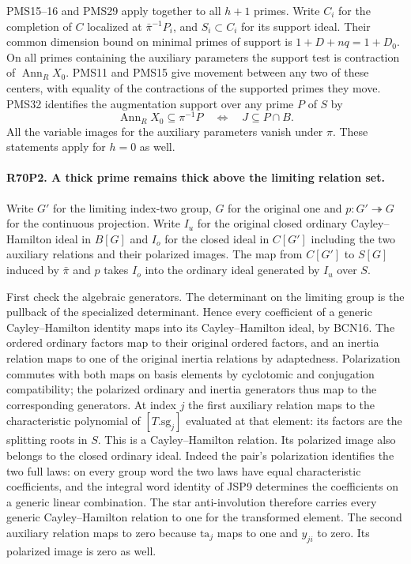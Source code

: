 PMS15--16 and PMS29 apply together to all $h+1$ primes.
Write $C_i$ for the completion of $C$ localized at
$\bar\pi^{-1}P_i$, and $S_i\subset C_i$ for its support ideal.
Their common dimension bound on minimal primes of support is
$1+D+nq=1+D_0$. On all primes containing the auxiliary parameters
the support test is contraction of $\operatorname{Ann}_R X_0$.
PMS11 and PMS15 give movement between any two of these centers,
with equality of the contractions of the supported primes
they move. PMS32 identifies the augmentation support over any
prime $P$ of $S$ by
\[
 \operatorname{Ann}_R X_0\subseteq\pi^{-1}P
       \quad\Longleftrightarrow\quad J\subseteq P\cap B .
\]
All the variable images for the auxiliary parameters vanish under
$\pi$. These statements apply for $h=0$ as well.

\paragraph{R70P2. A thick prime remains thick above the limiting relation set.}
Write $G'$ for the limiting index-two group, $G$ for the original
one and $p:G'\twoheadrightarrow G$ for the continuous projection.
Write $I_u$ for the original closed ordinary Cayley--Hamilton
ideal in $B[G]$ and $I_o$ for the closed ideal in $C[G']$ including
the two auxiliary relations and their polarized images. The map
from $C[G']$ to $S[G]$ induced by $\bar\pi$ and $p$ takes
$I_o$ into the ordinary ideal generated by $I_u$ over $S$.

First check the algebraic generators. The determinant on the
limiting group is the pullback of the specialized determinant.
Hence every coefficient of a generic Cayley--Hamilton identity
maps into its Cayley--Hamilton ideal, by BCN16. The ordered
ordinary factors map to their original ordered factors, and
an inertia relation maps to one of the original inertia
relations by adaptedness. Polarization commutes with both maps
on basis elements by cyclotomic and conjugation compatibility;
the polarized ordinary and inertia generators thus map to the
corresponding generators. At index $j$ the first auxiliary
relation maps to the characteristic polynomial of $[T.\mathrm{sg}_j]$
evaluated at that element: its factors are the splitting roots
in $S$. This is a Cayley--Hamilton relation. Its polarized image
also belongs to the closed ordinary ideal. Indeed the pair's polarization identifies the two full laws: on every group word
the two laws have equal characteristic coefficients, and the
integral word identity of JSP9 determines the coefficients on a
generic linear combination. The star anti-involution therefore carries every generic
Cayley--Hamilton relation to one for the transformed element. The second auxiliary relation maps to zero
because $\mathrm{ta}_j$ maps to one and $y_{ji}$ to zero.
Its polarized image is zero as well.


